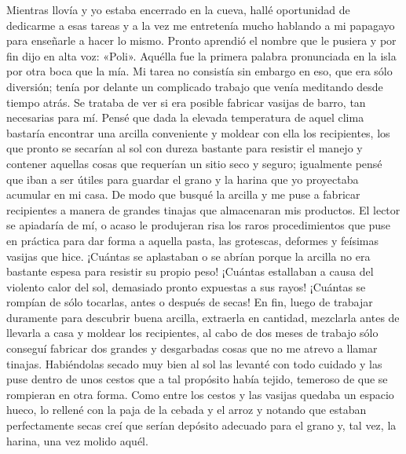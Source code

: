\documentclass{novela}
\begin{document}
    Mientras llovía y yo estaba encerrado en la cueva, hallé oportunidad de dedicarme a esas tareas y a la vez me entretenía mucho hablando a mi papagayo para enseñarle a hacer lo mismo. Pronto aprendió el nombre que le pusiera y por fin dijo en alta voz: «Poli». Aquélla fue la primera palabra pronunciada en la isla por otra boca que la mía. Mi tarea no consistía sin embargo en eso, que era sólo diversión; tenía por delante un complicado trabajo que venía meditando desde tiempo atrás. Se trataba de ver si era posible fabricar vasijas de barro, tan necesarias para mí. Pensé que dada la elevada temperatura de aquel clima bastaría encontrar una arcilla conveniente y moldear con ella los recipientes, los que pronto se secarían al sol con dureza bastante para resistir el manejo y contener aquellas cosas que requerían un sitio seco y seguro; igualmente pensé que iban a ser útiles para guardar el grano y la harina que yo proyectaba acumular en mi casa. De modo que busqué la arcilla y me puse a fabricar recipientes a manera de grandes tinajas que almacenaran mis productos.
    El lector se apiadaría de mí, o acaso le produjeran risa los raros procedimientos que puse en práctica para dar forma a aquella pasta, las grotescas, deformes y feísimas vasijas que hice. ¡Cuántas se aplastaban o se abrían porque la arcilla no era bastante espesa para resistir su propio peso! ¡Cuántas estallaban a causa del violento calor del sol, demasiado pronto expuestas a sus rayos! ¡Cuántas se rompían de sólo tocarlas, antes o después de secas! En fin, luego de trabajar duramente para descubrir buena arcilla, extraerla en cantidad, mezclarla antes de llevarla a casa y moldear los recipientes, al cabo de dos meses de trabajo sólo conseguí fabricar dos grandes y desgarbadas cosas que no me atrevo a llamar tinajas.
    Habiéndolas secado muy bien al sol las levanté con todo cuidado y las puse dentro de unos cestos que a tal propósito había tejido, temeroso de que se rompieran en otra forma. Como entre los cestos y las vasijas quedaba un espacio hueco, lo rellené con la paja de la cebada y el arroz y notando que estaban perfectamente secas creí que serían depósito adecuado para el grano y, tal vez, la harina, una vez molido aquél.
\end{document}
